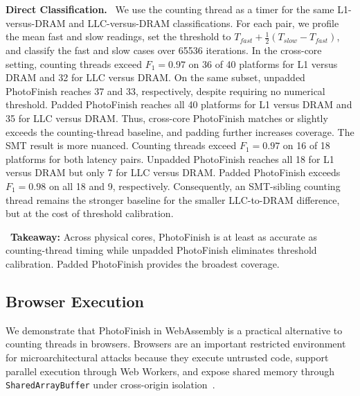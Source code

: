 \documentclass[letterpaper,twocolumn,10pt]{article} %
\newcommand{\paragrabf}[1]{\noindent \textbf{#1.}\ }
\newcommand{\AttackName}{PhotoFinish\xspace}
\newcommand{\takeaway}[1]{%
\begin{tcolorbox}[boxsep=1pt,left=2pt,right=2pt,top=1pt,bottom=1pt]
    \faLightbulb[regular]~\textbf{Takeaway:} #1
\end{tcolorbox}
}
\begin{document}
\paragrabf{Direct Classification}
We use the counting thread as a timer for the same L1-versus-DRAM and LLC-versus-DRAM classifications.
For each pair, we profile the mean fast and slow readings, set the threshold to
$T_{fast}+\frac{1}{2}(T_{slow}-T_{fast})$, and classify the fast and slow cases over \num{65536} iterations.
In the cross-core setting, counting threads exceed $F_1=0.97$ on \num{36} of \num{40} platforms for L1 versus DRAM and \num{32} for LLC versus DRAM.
On the same subset, unpadded \AttackName reaches \num{37} and \num{33}, respectively, despite requiring no numerical threshold.
Padded \AttackName reaches all \num{40} platforms for L1 versus DRAM and \num{35} for LLC versus DRAM.
Thus, cross-core \AttackName matches or slightly exceeds the counting-thread baseline, and padding further increases coverage.
The SMT result is more nuanced.
Counting threads exceed $F_1=0.97$ on \num{16} of \num{18} platforms for both latency pairs.
Unpadded \AttackName reaches all \num{18} for L1 versus DRAM but only \num{7} for LLC versus DRAM. Padded \AttackName exceeds $F_1=0.98$ on all \num{18} and \num{9}, respectively.
Consequently, an SMT-sibling counting thread remains the stronger baseline for the smaller LLC-to-DRAM difference, but at the cost of threshold calibration.


\takeaway{Across physical cores, \AttackName is at least as accurate as counting-thread timing while unpadded \AttackName eliminates threshold calibration. Padded \AttackName provides the broadest coverage.}

\subsection{Browser Execution}\label{subsec:attackname-in-the-browser}

We demonstrate that \AttackName in WebAssembly is a practical alternative to counting threads in browsers.
Browsers are an important restricted environment for microarchitectural attacks because they execute untrusted code, support parallel execution through Web Workers, and expose shared memory through \texttt{SharedArrayBuffer} under cross-origin isolation~\cite{Oren2015,Roettger2021SpectreJS,W3C2015WebWorker,FirefoxSharedArrayBuffer}.
\end{document}
